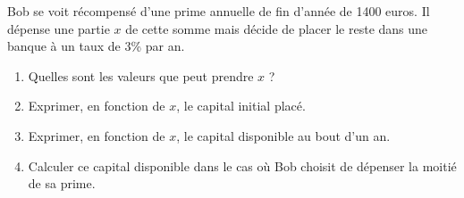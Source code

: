 
Bob se voit récompensé d'une prime annuelle de fin d’année de 1400 euros. Il dépense une partie $x$ de cette somme mais
décide de placer le reste dans une banque à un taux de 3\% par an.
\begin{enumerate}
\item Quelles sont les valeurs que peut prendre $x$ ?
\item Exprimer, en fonction de $x$, le capital initial placé.
\item Exprimer, en fonction de $x$, le capital disponible au bout d'un an.
\item Calculer ce capital disponible dans le cas où Bob choisit de dépenser la moitié de sa prime.
\end{enumerate}